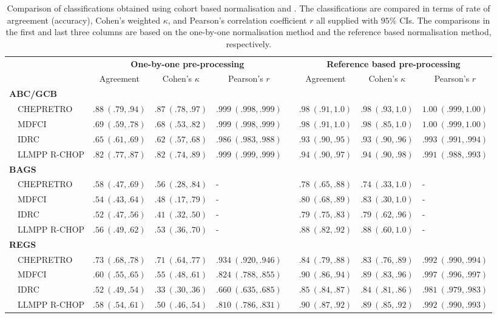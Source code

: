 \begin{table}[!h]%
{\scriptsize
\caption{Comparison of classifications obtained using cohort based
normalisation and \hemaClass{}.
The classifications are compared in terms of rate of argreement (accuracy),
Cohen's weighted $\kappa$, and Pearson's correlation coefficient $r$ all
supplied with $95\%$ CIs. The comparisons in the first and last three columns
are based on the one-by-one normalisation method and the reference based
normalisation method, respectively.\label{tab:classALL}}
\begin{center}
\begin{tabular}{llllclll}
\hline\hline
\multicolumn{1}{l}{\bfseries }&\multicolumn{3}{c}{\bfseries One-by-one pre-processing}&\multicolumn{1}{c}{\bfseries }&\multicolumn{3}{c}{\bfseries Reference based pre-processing}\tabularnewline
\cline{2-4} \cline{6-8}
\multicolumn{1}{l}{}&\multicolumn{1}{c}{Agreement}&\multicolumn{1}{c}{Cohen's $\kappa$}&\multicolumn{1}{c}{Pearson's $r$}&\multicolumn{1}{c}{}&\multicolumn{1}{c}{Agreement}&\multicolumn{1}{c}{Cohen's $\kappa$}&\multicolumn{1}{c}{Pearson's $r$}\tabularnewline
\hline
{\bfseries ABC/GCB}&&&&&&&\tabularnewline
~~CHEPRETRO&$.88~(.79, .94)$&$.87~(.78, .97)$&$.999~(.998, .999)$&&$.98~(.91, 1.0)$&$.98~(.93, 1.0)$&$1.00~(.999, 1.00)$\tabularnewline
~~MDFCI&$.69~(.59, .78)$&$.68~(.53, .82)$&$.999~(.998, .999)$&&$.98~(.91, 1.0)$&$.98~(.85, 1.0)$&$1.00~(.999, 1.00)$\tabularnewline
~~IDRC&$.65~(.61, .69)$&$.62~(.57, .68)$&$.986~(.983, .988)$&&$.93~(.90, .95)$&$.93~(.90, .96)$&$.993~(.991, .994)$\tabularnewline
~~LLMPP R-CHOP&$.82~(.77, .87)$&$.82~(.74, .89)$&$.999~(.999, .999)$&&$.94~(.90, .97)$&$.94~(.90, .98)$&$.991~(.988, .993)$\tabularnewline
\hline
{\bfseries BAGS}&&&&&&&\tabularnewline
~~CHEPRETRO&$.58~(.47, .69)$&$.56~(.28, .84)$&-&&$.78~(.65, .88)$&$.74~(.33, 1.0)$&-\tabularnewline
~~MDFCI&$.54~(.43, .64)$&$.48~(.17, .79)$&-&&$.80~(.68, .89)$&$.83~(.30, 1.0)$&-\tabularnewline
~~IDRC&$.52~(.47, .56)$&$.41~(.32, .50)$&-&&$.79~(.75, .83)$&$.79~(.62, .96)$&-\tabularnewline
~~LLMPP R-CHOP&$.56~(.49, .62)$&$.53~(.36, .70)$&-&&$.88~(.82, .92)$&$.88~(.60, 1.0)$&-\tabularnewline
\hline
{\bfseries REGS}&&&&&&&\tabularnewline
~~CHEPRETRO&$.73~(.68, .78)$&$.71~(.64, .77)$&$.934~(.920, .946)$&&$.84~(.79, .88)$&$.83~(.76, .89)$&$.992~(.990, .994)$\tabularnewline
~~MDFCI&$.60~(.55, .65)$&$.55~(.48, .61)$&$.824~(.788, .855)$&&$.90~(.86, .94)$&$.89~(.83, .96)$&$.997~(.996, .997)$\tabularnewline
~~IDRC&$.52~(.49, .54)$&$.33~(.30, .36)$&$.660~(.635, .685)$&&$.85~(.84, .87)$&$.84~(.81, .86)$&$.981~(.979, .983)$\tabularnewline
~~LLMPP R-CHOP&$.58~(.54, .61)$&$.50~(.46, .54)$&$.810~(.786, .831)$&&$.90~(.87, .92)$&$.89~(.85, .92)$&$.992~(.990, .993)$\tabularnewline
\hline
\end{tabular}\end{center}}

\end{table}
